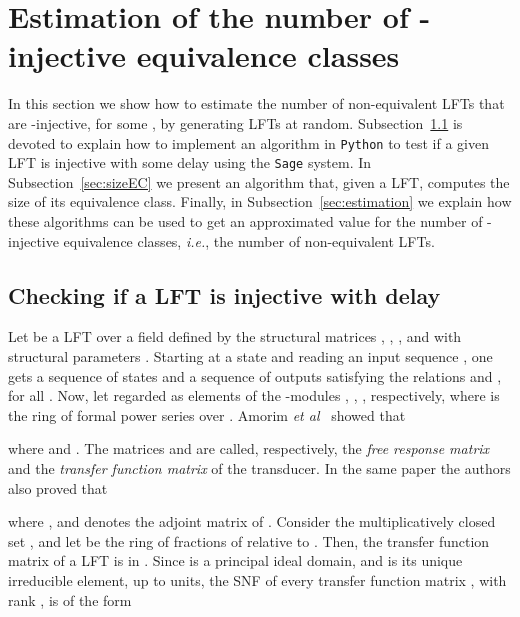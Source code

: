 \documentclass{ocg}
\newcommand{\LFT}{LFT}
\begin{document}
\section{Estimation of the number of -injective equivalence
  classes}\label{EstEquiClass}
In this section we show how to estimate the number of non-equivalent
\LFT{}s that are -injective, for some , by
generating \LFT{}s at random. Subsection~\ref{checkinvertibility} is
devoted to explain how to implement an algorithm in \texttt{Python} to test
if a given \LFT{} is injective with some delay  using the
\texttt{Sage} system. In Subsection~\ref{sec:sizeEC} we present an
algorithm that, given a \LFT, computes the size of its equivalence
class.  Finally, in Subsection~\ref{sec:estimation} we explain how
these algorithms can be used to get an approximated value for the
number of -injective equivalence classes, {\it i.e.}, the number
of non-equivalent \LFT{}s.


\subsection{Checking if a \LFT{} is injective with delay
  } \label{checkinvertibility}
Let  be a \LFT{} over a field  defined by the structural matrices , , ,  and with structural parameters . Starting at a state  and reading an input sequence
, one gets a sequence of states  and
a sequence of outputs  satisfying the relations  and , for all . Now, let  regarded as elements of the
-modules , , ,
respectively, where  is the ring of formal power series over
. Amorim \textit{et al}~\cite{ITA:9218509} showed that

where  and . The matrices  and  are called, respectively, the
\emph{free response matrix} and the \emph{transfer function matrix} of
the transducer. In the same paper the authors also proved that

where , and  denotes the adjoint matrix of
. Consider the multiplicatively closed set
, and let
 be the ring of fractions of  relative
to . Then, the transfer function matrix of a \LFT{} is in
. Since  is a
principal ideal domain, and  is its unique irreducible element, up
to units, the SNF of every transfer function matrix , with rank
, is of the form
\end{document}
